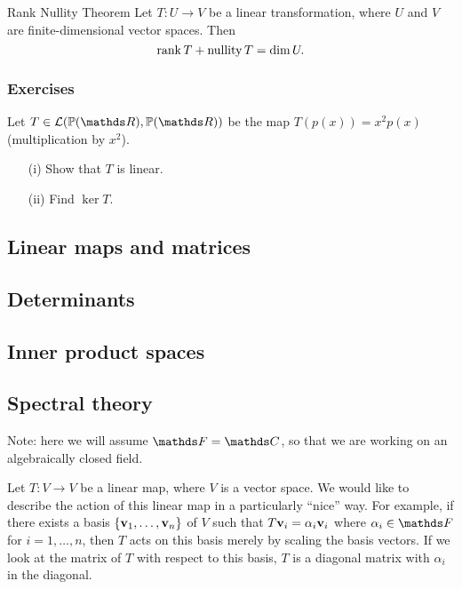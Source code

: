 \documentclass{article}
\begin{document}
\begin{theorem}{Rank Nullity Theorem}
Let $T:U \to V$ be a linear transformation, where $U$ and $V$ are finite-dimensional vector spaces. Then  
\begin{equation*}
\operatorname{rank} T + \operatorname{nullity}  T = \dim U.
\end{equation*}
\end{theorem}

\subsubsection{Exercises}
\begin{exercise}
Let $T \in \cL(\mathbb{P}(\R),\mathbb{P}(\R))$ be the map $T (p(x))= x^2 p(x)$ (multiplication by $x^2$). 
\begin{enumerate}
    \item[(i)] Show that $T$ is linear.
    \item[(ii)] Find $\ker T$.
\end{enumerate}
\end{exercise}

\subsection{Linear maps and matrices}


\subsection{Determinants}

\subsection{Inner product spaces}

\subsection{Spectral theory}

Note: here we will assume $\F = \C$, so that we are working on an algebraically closed field.


Let $T \colon V \to V$ be a linear map, where $V$ is a vector space.  We would like to describe the action of this linear map in a particularly ``nice'' way. For example, if there exists a basis $\{{\mathbf{v}}_1, \ldots, {\mathbf{v}}_n\}$ of $V$ such that $T{\mathbf{v}}_i = \alpha_i {\mathbf{v}}_i$ where $\alpha_i \in \F$ for $i = 1, \ldots, n$, then $T$ acts on this basis merely by scaling the basis vectors. If we look at the matrix of $T$ with respect to this basis, $T$ is a diagonal matrix with $\alpha_i$ in the diagonal. 
\end{document}

